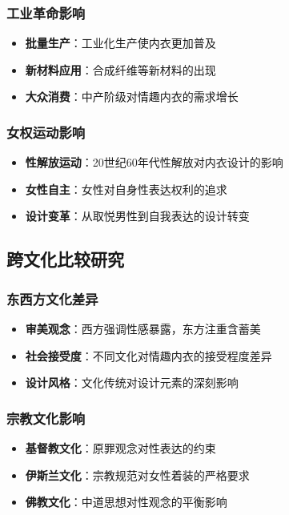 \documentclass[12pt,UTF8]{ctexbook}
\begin{document}
\subsubsection{工业革命影响}
\begin{itemize}[leftmargin=2cm]
	\item \textbf{批量生产}：工业化生产使内衣更加普及
	\item \textbf{新材料应用}：合成纤维等新材料的出现
	\item \textbf{大众消费}：中产阶级对情趣内衣的需求增长
\end{itemize}

\subsubsection{女权运动影响}
\begin{itemize}[leftmargin=2cm]
	\item \textbf{性解放运动}：20世纪60年代性解放对内衣设计的影响
	\item \textbf{女性自主}：女性对自身性表达权利的追求
	\item \textbf{设计变革}：从取悦男性到自我表达的设计转变
\end{itemize}

\subsection{跨文化比较研究}
\subsubsection{东西方文化差异}
\begin{itemize}[leftmargin=2cm]
	\item \textbf{审美观念}：西方强调性感暴露，东方注重含蓄美
	\item \textbf{社会接受度}：不同文化对情趣内衣的接受程度差异
	\item \textbf{设计风格}：文化传统对设计元素的深刻影响
\end{itemize}

\subsubsection{宗教文化影响}
\begin{itemize}[leftmargin=2cm]
	\item \textbf{基督教文化}：原罪观念对性表达的约束
	\item \textbf{伊斯兰文化}：宗教规范对女性着装的严格要求
	\item \textbf{佛教文化}：中道思想对性观念的平衡影响
\end{itemize}
\end{document}
